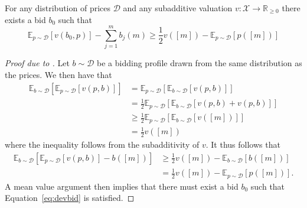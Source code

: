 \begin{lemma}[\cite{10.1145/2488608.2488634}]
  For any distribution of prices $ \mathcal{D} $ and any subadditive valuation $ v:\mathcal{X} \to \mathbb{R}_{\geq 0} $ there exists a bid $ b_0 $ such that
  \begin{equation}
    \label{eq:devbid}
    \mathbb{E}_{p \sim \mathcal{D}}[v(b_0, p)] - \sum_{j = 1}^{m} b_j(m) \geq \frac{1}{2}v([m]) - \mathbb{E}_{p \sim \mathcal{D}}[p([m])]
  \end{equation}
\end{lemma}
\begin{proof}[Proof due to \cite{10.1145/2488608.2488634}]
  Let $ b \sim \mathcal{D} $ be a bidding profile drawn from the same distribution as the prices. We then have that
  \begin{align*}
    \mathbb{E}_{b \sim \mathcal{D}}[\mathbb{E}_{p \sim \mathcal{D}}[v(p, b)]] &= \mathbb{E}_{p \sim \mathcal{D}}[\mathbb{E}_{b \sim \mathcal{D}}[v(p, b)]] \\
                                                                            &= \frac{1}{2} \mathbb{E}_{p \sim \mathcal{D}}[\mathbb{E}_{b \sim \mathcal{D}}[v(p, b) + v(p, b)]] \\
                                                                            & \geq  \frac{1}{2} \mathbb{E}_{p \sim \mathcal{D}}[\mathbb{E}_{b \sim \mathcal{D}}[v([m])]] \\
                                                                            &= \frac{1}{2}v([m])
  \end{align*}
  where the inequality follows from the subadditivity of $ v $. It thus follows that
  \begin{align*}
    \mathbb{E}_{b \sim \mathcal{D}}[\mathbb{E}_{p \sim \mathcal{D}}[v(p, b)] - b([m])] &\geq \frac{1}{2}v([m]) - \mathbb{E}_{b \sim \mathcal{D}}[b([m])] \\
                                                                                                 &= \frac{1}{2}v([m]) - \mathbb{E}_{p \sim \mathcal{D}}[p([m])]
  .\end{align*}
  A mean value argument then implies that there must exist a bid $ b_0 $ such that
  Equation~\ref{eq:devbid} is satisfied.
\end{proof}

